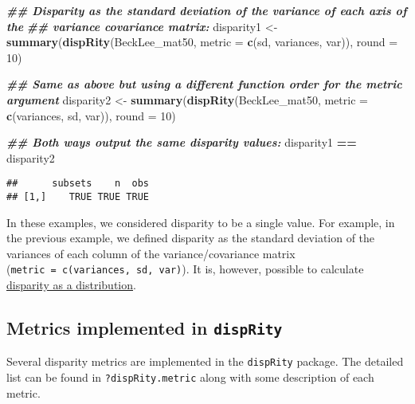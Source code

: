 \documentclass[
]{book}
\newenvironment{Shaded}{\begin{snugshade}}{\end{snugshade}}
\newcommand{\AttributeTok}[1]{\textcolor[rgb]{0.13,0.29,0.53}{#1}}
\newcommand{\DecValTok}[1]{\textcolor[rgb]{0.00,0.00,0.81}{#1}}
\newcommand{\DocumentationTok}[1]{\textcolor[rgb]{0.56,0.35,0.01}{\textbf{\textit{#1}}}}
\newcommand{\FunctionTok}[1]{\textcolor[rgb]{0.13,0.29,0.53}{\textbf{#1}}}
\newcommand{\NormalTok}[1]{#1}
\newcommand{\OtherTok}[1]{\textcolor[rgb]{0.56,0.35,0.01}{#1}}
\newcommand{\SpecialCharTok}[1]{\textcolor[rgb]{0.81,0.36,0.00}{\textbf{#1}}}
\begin{document}
\begin{Shaded}
\begin{Highlighting}[]
\DocumentationTok{\#\# Disparity as the standard deviation of the variance of each axis of the}
\DocumentationTok{\#\# variance covariance matrix:}
\NormalTok{disparity1 }\OtherTok{\textless{}{-}} \FunctionTok{summary}\NormalTok{(}\FunctionTok{dispRity}\NormalTok{(BeckLee\_mat50,}
                               \AttributeTok{metric =} \FunctionTok{c}\NormalTok{(sd, variances, var)),}
                      \AttributeTok{round =} \DecValTok{10}\NormalTok{)}

\DocumentationTok{\#\# Same as above but using a different function order for the metric argument}
\NormalTok{disparity2 }\OtherTok{\textless{}{-}} \FunctionTok{summary}\NormalTok{(}\FunctionTok{dispRity}\NormalTok{(BeckLee\_mat50,}
                               \AttributeTok{metric =} \FunctionTok{c}\NormalTok{(variances, sd, var)),}
                      \AttributeTok{round =} \DecValTok{10}\NormalTok{)}

\DocumentationTok{\#\# Both ways output the same disparity values:}
\NormalTok{disparity1 }\SpecialCharTok{==}\NormalTok{ disparity2}
\end{Highlighting}
\end{Shaded}

\begin{verbatim}
##      subsets    n  obs
## [1,]    TRUE TRUE TRUE
\end{verbatim}

In these examples, we considered disparity to be a single value.
For example, in the previous example, we defined disparity as the standard deviation of the variances of each column of the variance/covariance matrix (\texttt{metric\ =\ c(variances,\ sd,\ var)}).
It is, however, possible to calculate \protect\hyperlink{disparity-as-a-distribution}{disparity as a distribution}.

\hypertarget{metrics-implemented-in-disprity}{%
\subsection{\texorpdfstring{Metrics implemented in \texttt{dispRity}}{Metrics implemented in dispRity}}\label{metrics-implemented-in-disprity}}

Several disparity metrics are implemented in the \texttt{dispRity} package.
The detailed list can be found in \texttt{?dispRity.metric} along with some description of each metric.
\end{document}
